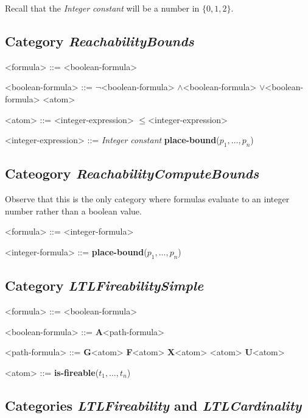 \documentclass[10pt,english,a4paper]{article}
\newcommand\set[1]           {{\{ #1 \mathclose \}}}
\newcommand\ctla             {\textbf{A}\xspace}
\newcommand\ltlf             {\textbf{F}\xspace}
\newcommand\ltlg             {\textbf{G}\xspace}
\newcommand\ltlx             {\textbf{X}\xspace}
\newcommand\ltlu             {\textbf{U}\xspace}
\newcommand\logicnot         {\boldmath$\lnot$\xspace}
\newcommand\logicand         {\boldmath$\land$\xspace}
\newcommand\logicor          {\boldmath$\lor$\xspace}
\newcommand\atomleq          {\boldmath$\leq$\xspace}
\newcommand\atomisfire[1]    {\textbf{is-fireable}(#1)}
\newcommand\atomplacebnd[1]  {\textbf{place-bound}(#1)}
\begin{document}
Recall that the \textit{Integer constant} will be a number in $\set{0,1,2}$.

\subsection{Category \textit{ReachabilityBounds}}

\begin{grammar}

<formula> ::= <boolean-formula>

<boolean-formula> ::=  \logicnot <boolean-formula>
 \logicand <boolean-formula>
 \logicor  <boolean-formula>
\alt <atom>

<atom> ::= <integer-expression> \atomleq <integer-expression>

<integer-expression> ::= \textit{Integer constant}
\alt \atomplacebnd{$p_1, \ldots, p_n$}

\end{grammar}

\subsection{Cateogory \textit{ReachabilityComputeBounds}}

Observe that this is the only category where formulas evaluate to an
integer number rather than a boolean value.

\begin{grammar}
<formula> ::= <integer-formula>

<integer-formula> ::= \atomplacebnd{$p_1, \ldots, p_n$}
\end{grammar}


\subsection{Category \textit{LTLFireabilitySimple}}

\begin{grammar}
<formula> ::= <boolean-formula>

<boolean-formula> ::= \ctla <path-formula>

<path-formula> ::=
     \ltlg <atom>
\alt \ltlf <atom>
\alt \ltlx <atom>
\alt <atom> \ltlu <atom>

<atom> ::= \atomisfire{$t_1, \ldots, t_n$}
\end{grammar}

\subsection{Categories \textit{LTLFireability} and \textit{LTLCardinality}}
\end{document}
